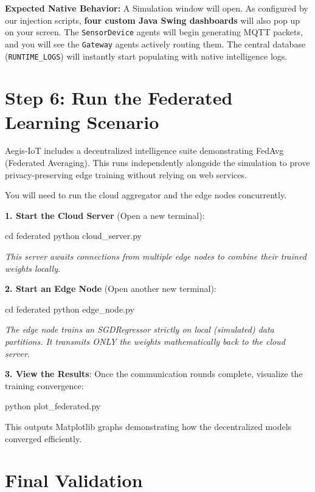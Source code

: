 \documentclass[12pt,a4paper]{article}
\begin{document}
\begin{infoBox}
\textbf{Expected Native Behavior:} 
A Simulation window will open. As configured by our injection scripts, \textbf{four custom Java Swing dashboards} will also pop up on your screen. The \texttt{SensorDevice} agents will begin generating MQTT packets, and you will see the \texttt{Gateway} agents actively routing them. The central database (\texttt{RUNTIME\_LOGS}) will instantly start populating with native intelligence logs.
\end{infoBox}

\section{Step 6: Run the Federated Learning Scenario}

Aegis-IoT includes a decentralized intelligence suite demonstrating FedAvg (Federated Averaging). This runs independently alongside the simulation to prove privacy-preserving edge training without relying on web services.

You will need to run the cloud aggregator and the edge nodes concurrently.

\textbf{1. Start the Cloud Server} (Open a new terminal):
\begin{terminalBox}
cd federated
python cloud\_server.py
\end{terminalBox}
\textit{This server awaits connections from multiple edge nodes to combine their trained weights locally.}

\textbf{2. Start an Edge Node} (Open another new terminal):
\begin{terminalBox}
cd federated
python edge\_node.py
\end{terminalBox}
\textit{The edge node trains an SGDRegressor strictly on local (simulated) data partitions. It transmits ONLY the weights mathematically back to the cloud server.}

\textbf{3. View the Results}:
Once the communication rounds complete, visualize the training convergence:
\begin{terminalBox}
python plot\_federated.py
\end{terminalBox}
This outputs Matplotlib graphs demonstrating how the decentralized models converged efficiently.

\section{Final Validation}
\end{document}
